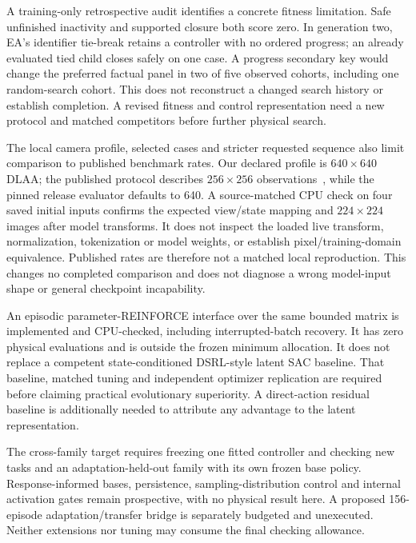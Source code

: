 \documentclass[sigconf,dvipsnames,balance=false]{acmart}
\begin{document}
A training-only retrospective audit identifies a concrete fitness limitation.
Safe unfinished inactivity and supported closure both score zero. In generation
two, EA's identifier tie-break retains a controller with no ordered progress;
an already evaluated tied child closes safely on one case. A progress secondary
key would change the preferred factual panel in two of five observed cohorts,
including one random-search cohort. This does not reconstruct a changed search
history or establish completion. A revised fitness and control representation
need a new protocol and matched competitors before further physical search.

The local camera profile, selected cases and stricter requested sequence also
limit comparison to published benchmark rates. Our declared profile is
$640\times640$ DLAA; the published protocol describes $256\times256$
observations~\cite{maniguard}, while the pinned release evaluator defaults to 640.
A source-matched CPU check on four saved initial inputs confirms the expected
view/state mapping and $224\times224$ images after model transforms. It does not
inspect the loaded live transform, normalization, tokenization or model weights,
or establish pixel/training-domain equivalence. Published rates are therefore
not a matched local reproduction. This changes no completed comparison and does
not diagnose a wrong model-input shape or general checkpoint incapability.

An episodic parameter-REINFORCE interface over the same bounded matrix is implemented
and CPU-checked, including interrupted-batch recovery. It has zero physical
evaluations and is outside the frozen minimum allocation. It does not replace a
competent state-conditioned DSRL-style latent SAC baseline. That baseline, matched
tuning and independent optimizer replication are required before claiming practical
evolutionary superiority. A direct-action residual baseline is additionally needed
to attribute any advantage to the latent representation.

The cross-family target requires freezing one fitted controller and checking new
tasks and an adaptation-held-out family with its own frozen base policy.
Response-informed bases, persistence, sampling-distribution control and internal
activation gates remain prospective, with no physical result here. A proposed
156-episode adaptation/transfer bridge is separately budgeted and unexecuted.
Neither extensions nor tuning may consume the final checking allowance.
\end{document}
